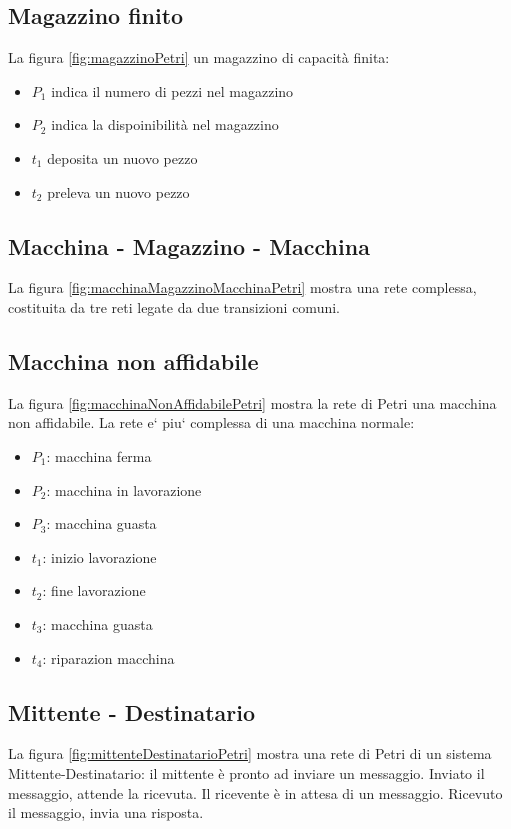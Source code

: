 \documentclass[a4paper]{report}
\begin{document}
\subsection{Magazzino finito}
La figura \ref{fig:magazzinoPetri} un magazzino di capacit\`a finita:
\begin{itemize}
\item $P_1$ indica il numero di pezzi nel magazzino
\item $P_2$ indica la dispoinibilit\`a nel magazzino
\item $t_1$ deposita un nuovo pezzo
\item $t_2$ preleva un nuovo pezzo
\end{itemize}



\subsection{Macchina - Magazzino - Macchina}

La figura \ref{fig:macchinaMagazzinoMacchinaPetri} mostra una rete
complessa, costituita da tre reti legate da due transizioni comuni.

\subsection{Macchina non affidabile}

La figura \ref{fig:macchinaNonAffidabilePetri} mostra la rete di Petri
una macchina non affidabile. La rete e` piu` complessa di una macchina
normale:
\begin{itemize}
\item $P_1$: macchina ferma
\item $P_2$: macchina in lavorazione
\item $P_3$: macchina guasta
\item $t_1$: inizio lavorazione
\item $t_2$: fine lavorazione
\item $t_3$: macchina guasta
\item $t_4$: riparazion macchina
\end{itemize}

\subsection{Mittente - Destinatario}

La figura \ref{fig:mittenteDestinatarioPetri} mostra una rete di Petri
di un sistema Mittente-Destinatario: il mittente \`e pronto ad inviare
un messaggio. Inviato il messaggio, attende la ricevuta. Il ricevente
\`e in attesa di un messaggio. Ricevuto il messaggio, invia una
risposta. 
\end{document}
